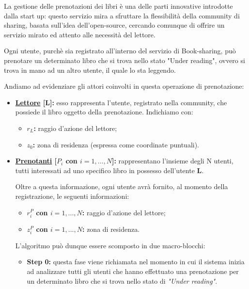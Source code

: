 La gestione delle prenotazioni dei libri è una delle parti innovative introdotte dalla start up: questo servizio mira a sfruttare la flessibilità della community di sharing, basata sull'idea dell'open-source, cercando comunque di offrire un servizio mirato ed attento alle necessità del lettore.

Ogni utente, purchè sia registrato all'interno del servizio di Book-sharing, può prenotare un determinato libro che si trova nello stato "Under reading", ovvero si trova in mano ad un altro utente, il quale lo sta leggendo.

Andiamo ad evidenziare gli attori coinvolti in questa operazione di prenotazione:
\begin{itemize}
	\item \textbf{\underline{Lettore} [L]:} esso rappresenta l'utente, registrato nella community, che possiede il libro oggetto della prenotazione. Indichiamo con:
	\begin{itemize}
		\item \textbf{{\LARGE $r_{L}$}:} raggio d'azione del lettore;
		\item \textbf{{\LARGE $ z_{0} $}:} zona di residenza (espressa come coordinate puntuali).
	\end{itemize}
	\item \textbf{\underline{Prenotanti} [$ P_{i}$ con $i=1,...,N $]:} rappresentano l'insieme degli N utenti, tutti interessati ad uno specifico libro in possesso dell'utente \textbf{L}.
	
	Oltre a questa informazione, ogni utente avrà fornito, al momento della registrazione, le seguenti informazioni:
	\begin{itemize}
		\item \textbf{{\LARGE $r^{P}_{i}$} con $i=1,...,N $:} raggio d'azione del lettore;
		\item \textbf{{\LARGE $z^{P}_{i}$} con $i=1,...,N $:} zona di residenza.
	\end{itemize}

	L'algoritmo può dunque essere scomposto in due macro-blocchi:
	\begin{itemize}
		\item \textbf{Step 0:} questa fase viene richiamata nel momento in cui il sistema inizia ad analizzare tutti gli utenti che hanno effettuato una prenotazione per un determinato libro che si trova nello stato di \textit{"Under reading"}.
		

\end{itemize}
\end{itemize}
